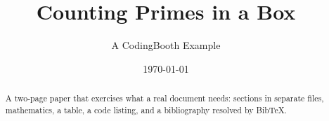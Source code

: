 \documentclass[11pt]{article}
\title{Counting Primes in a Box}
\author{A CodingBooth Example}
\date{\today}
\begin{document}
\maketitle

\begin{abstract}
A two-page paper that exercises what a real document needs: sections in separate files,
mathematics, a table, a code listing, and a bibliography resolved by BibTeX.
\end{abstract}






\end{document}
